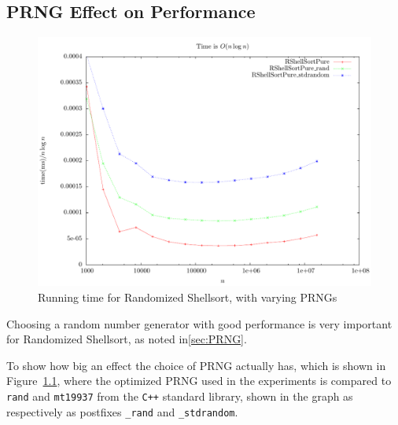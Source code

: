 \begin{appendices}
\chapter{PRNG Effect on Performance}
\label{app:PRNG}
\begin{figure}
\center
\includegraphics[width=\textwidth]{graphs/rand/nlogntime.pdf}
\caption{Running time for Randomized Shellsort, with varying PRNGs}
\label{fig:rand}
\end{figure}
Choosing a random number generator with good performance is very important for Randomized Shellsort, as noted in\ref{sec:PRNG}.

To show how big an effect the choice of PRNG actually has, which is shown in Figure~\ref{fig:rand}, where the optimized PRNG used in the experiments is compared to \texttt{rand} and \texttt{mt19937} from the \texttt{C++} standard library, shown in the graph as respectively as postfixes \texttt{\_rand} and \texttt{\_stdrandom}.
\end{appendices}
